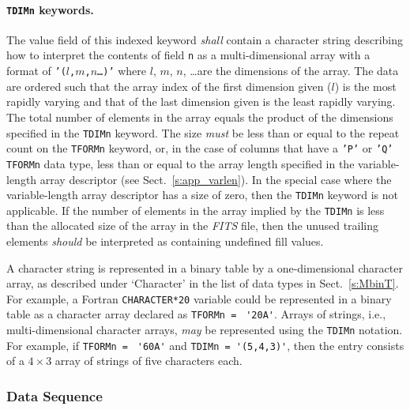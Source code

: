 \documentclass[onecolumn]{aa}
\begin{document}
   \paragraph{{\tt TDIMn} keywords.} \label{s:app_dim}
    The value field of this indexed keyword 
    {\em shall} contain a character string describing how to interpret
    the contents of field {\tt n} as a multi-dimensional array
    with a format of {\tt '($l$,$m$,$n$\ldots)'} where $l$, $m$, $n$,
    \ldots are the dimensions of the array. The data are ordered such 
    that the array index of the first dimension given ($l$) is the most
    rapidly varying and that of the last dimension given is the least 
    rapidly varying.  The total number of elements in the array equals
    the product of the dimensions specified in the {\tt TDIMn} keyword.
    The size {\em must} be less than or equal to the repeat count on the 
    {\tt TFORMn} keyword, or, in the case of columns that have a
    {\tt 'P'} or {\tt 'Q'} {\tt TFORMn} data type, less than or equal to the array length
    specified in the variable-length 
    array descriptor 
    (see Sect.\ \ref{s:app_varlen}).  In the special case where the 
    variable-length array descriptor has a size of zero, then the
    {\tt TDIMn} keyword is not applicable.  If the number of elements
    in the array implied by the {\tt TDIMn} is less than the allocated
    size of the array in the {\em FITS\/} file, then the unused trailing
    elements {\em should} be interpreted as containing undefined fill values.

    A character string  is represented in a binary
table by a one-dimensional character array, as described under `Character'
in the list of data types in
Sect.\ \ref{s:MbinT}.  For example, a
Fortran {\tt CHARACTER*20}  variable could be represented in a
binary table as a character array declared as
{\tt TFORMn = } \verb*/'20A'/.  Arrays of strings, i.e.,
multi-dimensional character arrays, {\em may} be represented using the
{\tt TDIMn} notation.  For example, if {\tt TFORMn  = } \verb*/'60A'/
and \verb/TDIMn = '(5,4,3)'/, then the entry consists of a
$4\times 3$ array of strings of five characters each. 
    
   \subsubsection{Data Sequence}
   \label{s:btds}
   
\end{document}
